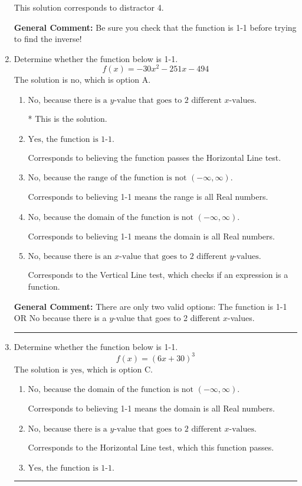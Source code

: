 \documentclass{extbook}[14pt]
\newcommand{\litem}[1]{\item #1

\rule{\textwidth}{0.4pt}}
\begin{document}
\begin{enumerate}
{\begin{enumerate}[label=\Alph*.]
 This solution corresponds to distractor 4.
\end{enumerate}

\textbf{General Comment:} Be sure you check that the function is 1-1 before trying to find the inverse!
}
\litem{
Determine whether the function below is 1-1.
\[ f(x) = -30 x^2 - 251 x - 494 \]
The solution is \( \text{no} \), which is option A.\begin{enumerate}[label=\Alph*.]
\item \( \text{No, because there is a $y$-value that goes to 2 different $x$-values.} \)

* This is the solution.
\item \( \text{Yes, the function is 1-1.} \)

Corresponds to believing the function passes the Horizontal Line test.
\item \( \text{No, because the range of the function is not $(-\infty, \infty)$.} \)

Corresponds to believing 1-1 means the range is all Real numbers.
\item \( \text{No, because the domain of the function is not $(-\infty, \infty)$.} \)

Corresponds to believing 1-1 means the domain is all Real numbers.
\item \( \text{No, because there is an $x$-value that goes to 2 different $y$-values.} \)

Corresponds to the Vertical Line test, which checks if an expression is a function.
\end{enumerate}

\textbf{General Comment:} There are only two valid options: The function is 1-1 OR No because there is a $y$-value that goes to 2 different $x$-values.
}
\litem{
Determine whether the function below is 1-1.
\[ f(x) = (6 x + 30)^3 \]
The solution is \( \text{yes} \), which is option C.\begin{enumerate}[label=\Alph*.]
\item \( \text{No, because the domain of the function is not $(-\infty, \infty)$.} \)

Corresponds to believing 1-1 means the domain is all Real numbers.
\item \( \text{No, because there is a $y$-value that goes to 2 different $x$-values.} \)

Corresponds to the Horizontal Line test, which this function passes.
\item \( \text{Yes, the function is 1-1.} \)


\end{enumerate}}
\end{enumerate}
\end{document}
